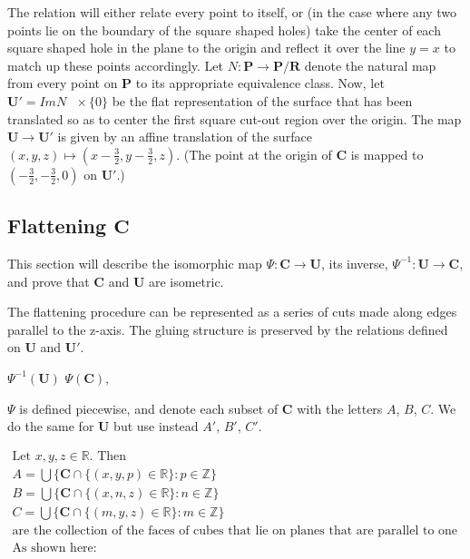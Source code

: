 \documentclass[]{article}
\begin{document}
The relation will either relate every point to itself, or (in the case where any two points lie on the boundary of the square shaped holes) take the center of each square shaped hole in the plane to the origin and reflect it over the line $y=x$ to match up these points accordingly.  Let $N: \mathbf{P} \rightarrow \mathbf{P}/\mathbf{R}$ denote the natural map from every point on $\mathbf{P}$ to its appropriate equivalence class. Now, let $\mathbf{U}' = Im N \text{ }\times\{0\}$ be the flat representation of the surface that has been translated so as to center the first square cut-out region over the origin. The map $\mathbf{U}\rightarrow\mathbf{U}'$ is given by an affine translation of the surface $(x,y,z) \mapsto (x-\frac{3}{2},y-\frac{3}{2},z)$. (The point at the origin of $\mathbf{C}$ is mapped to $(-\frac{3}{2},-\frac{3}{2},0) \text{ on } \mathbf{U}'$.)

\subsection{Flattening $\mathbf{C}$}
This section will describe the isomorphic map $\Psi:\mathbf{C}\rightarrow\mathbf{U}$, its inverse, $\Psi^{-1}:\mathbf{U}\rightarrow\mathbf{C}$, and prove that $\mathbf{C}$ and $\mathbf{U}$ are isometric.

The flattening procedure can be represented as a series of cuts made along edges parallel to the z-axis. The gluing structure is preserved by the relations defined on $\textbf{U}$ and $\textbf{U}'$. 

\begin{center}


 $\Psi^{-1}(\mathbf{U})$  $\Psi(\mathbf{C})$, 
\end{center}

$\Psi$ is defined piecewise, and denote each subset of $\mathbf{C}$ with the letters $A$, $B$, $C$. We do the same for $\mathbf{U}$ but use instead $A'$, $B'$, $C'$. 

\begin{gather*}
	\text{Let }x,y,z\in\mathbb{R}. \text{ Then}
	\\A=\bigcup\big\{\mathbf{C}\cap\{(x,y,p)\in\mathbb{R}\}: p\in\mathbb{Z}\big\}
	\\B=\bigcup\big\{\mathbf{C}\cap\{(x,n,z)\in\mathbb{R}\}: n\in\mathbb{Z}\big\}
	\\C=\bigcup\big\{\mathbf{C}\cap\{(m,y,z)\in\mathbb{R}\}: m\in\mathbb{Z}\big\}
	\\\text{are the collection of the faces of cubes that lie on planes that are parallel to one another.}
	\\\text{As shown here:}
\end{gather*}
\end{document}
